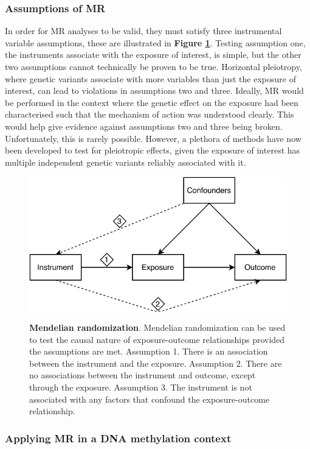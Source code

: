 \documentclass[11pt,oneside]{bristolthesis}
\begin{document}
\hypertarget{assumptions-of-mr}{%
\subsubsection{Assumptions of MR}\label{assumptions-of-mr}}

In order for MR analyses to be valid, they must satisfy three instrumental variable assumptions, these are illustrated in \textbf{Figure \ref{fig:mr-diagram}}. Testing assumption one, the instruments associate with the exposure of interest, is simple, but the other two assumptions cannot technically be proven to be true. Horizontal pleiotropy, where genetic variants associate with more variables than just the exposure of interest, can lead to violations in assumptions two and three. Ideally, MR would be performed in the context where the genetic effect on the exposure had been characterised such that the mechanism of action was understood clearly. This would help give evidence against assumptions two and three being broken. Unfortunately, this is rarely possible. However, a plethora of methods have now been developed to test for pleiotropic effects, given the exposure of interest has multiple independent genetic variants reliably associated with it.




\begin{figure}

{\centering \includegraphics[width=1\linewidth]{figure/01-introduction/mr-diagram} 

}

\caption[Mendelian randomization]{\textbf{Mendelian randomization}. Mendelian randomization can be used to test the causal nature of exposure-outcome relationships provided the assumptions are met. Assumption 1. There is an association between the instrument and the exposure. Assumption 2. There are no associations between the instrument and outcome, except through the exposure. Assumption 3. The instrument is not associated with any factors that confound the exposure-outcome relationship.}\label{fig:mr-diagram}
\end{figure}
\hypertarget{applying-mr-in-a-dna-methylation-context}{%
\subsubsection{Applying MR in a DNA methylation context}\label{applying-mr-in-a-dna-methylation-context}}
\end{document}
